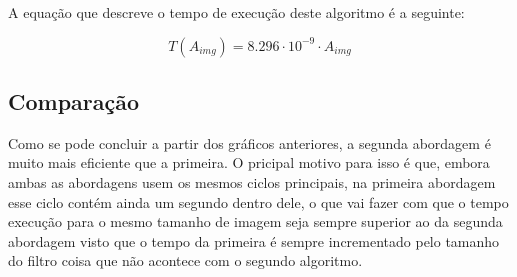 A equação que descreve o tempo de execução deste algoritmo é a seguinte:

\begin{equation}
    \label{eq:imageblur/second-time}
    T(A_{img}) = 8.296 \cdot 10^{-9} \cdot A_{img}
\end{equation}

\subsection{Comparação}

Como se pode concluir a partir dos gráficos anteriores, a segunda abordagem é muito mais eficiente que a primeira. O pricipal motivo para isso é que, embora ambas as abordagens usem os mesmos ciclos principais, na primeira abordagem esse ciclo contém ainda um segundo dentro dele, o que vai fazer com que o tempo execução para o mesmo tamanho de imagem seja sempre superior ao da segunda abordagem visto que o tempo da primeira é sempre incrementado pelo tamanho do filtro coisa que não acontece com o segundo algoritmo.

